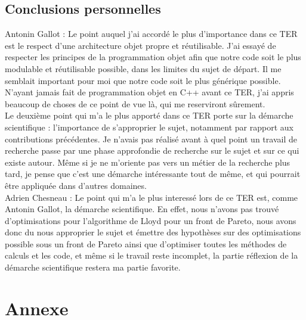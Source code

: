 ﻿\documentclass{meta}
\begin{document}
{\subsection{Conclusions personnelles}
Antonin Gallot : Le point auquel j'ai accordé le plus d'importance dans ce TER est le respect d'une architecture objet propre et réutilisable. J'ai essayé de respecter les principes de la programmation objet afin que notre code soit le plus modulable et réutilisable possible, dans les limites du sujet de départ. Il me semblait important pour moi que notre code soit le plus générique possible. N'ayant jamais fait de programmation objet en C++ avant ce TER, j'ai appris beaucoup de choses de ce point de vue là, qui me reserviront sûrement.\\
Le deuxième point qui m'a le plus apporté dans ce TER porte sur la démarche scientifique : l'importance de s'approprier le sujet, notamment par rapport aux contributions précédentes. Je n'avais pas réalisé avant à quel point un travail de recherche passe par une phase approfondie de recherche sur le sujet et sur ce qui existe autour. Même si je ne m'oriente pas vers un métier de la recherche plus tard, je pense que c'est une démarche intéressante tout de même, et qui pourrait être appliquée dans d'autres domaines.\\
Adrien Chesneau : Le point qui m'a le plus interessé lors de ce TER est, comme Antonin Gallot, la démarche scientifique. En effet, nous n'avons pas trouvé d'optimisations pour l'algorithme de Lloyd pour un front de Pareto, nous avons donc du nous approprier le sujet et émettre des hypothèses sur des optimisations possible sous un front de Pareto ainsi que d'optimiser toutes les méthodes de calculs et les code, et même si le travail reste incomplet, la partie réflexion de la démarche scientifique restera ma partie favorite. 

\newpage
\section{Annexe}
}
\end{document}
